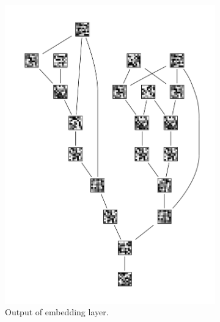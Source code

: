 \documentclass{llncs}
\begin{document}
\begin{figure}
	\centering
	\captionsetup[subfigure]{justification=centering}
	\begin{subfigure}{.3\textwidth}
		\centering
		\includegraphics[width=\linewidth]{embedding}
		\caption{Output of embedding layer.}
	\end{subfigure}
	\begin{subfigure}{.3\textwidth}
		\centering

\end{subfigure}
\end{figure}
\end{document}
